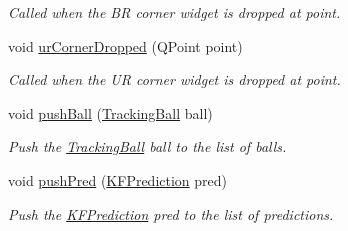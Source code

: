 \begin{DoxyCompactItemize}
\begin{DoxyCompactList}\small\item\em Called when the BR corner widget is dropped at point. \end{DoxyCompactList}\item 
void \hyperlink{classTrackVideoWidget_aa0ffe7455a1940941387f3bf8a8c81a0}{ur\+Corner\+Dropped} (Q\+Point point)\hypertarget{classTrackVideoWidget_aa0ffe7455a1940941387f3bf8a8c81a0}{}\label{classTrackVideoWidget_aa0ffe7455a1940941387f3bf8a8c81a0}

\begin{DoxyCompactList}\small\item\em Called when the UR corner widget is dropped at point. \end{DoxyCompactList}\item 
void \hyperlink{classTrackVideoWidget_a29f589a7716093ffe59af7e66eebf72a}{push\+Ball} (\hyperlink{classTrackingBall}{Tracking\+Ball} ball)\hypertarget{classTrackVideoWidget_a29f589a7716093ffe59af7e66eebf72a}{}\label{classTrackVideoWidget_a29f589a7716093ffe59af7e66eebf72a}

\begin{DoxyCompactList}\small\item\em Push the \hyperlink{classTrackingBall}{Tracking\+Ball} ball to the list of balls. \end{DoxyCompactList}\item 
void \hyperlink{classTrackVideoWidget_ae9e2d736b274c1601af5f8f1ca36586a}{push\+Pred} (\hyperlink{classKFPrediction}{K\+F\+Prediction} pred)\hypertarget{classTrackVideoWidget_ae9e2d736b274c1601af5f8f1ca36586a}{}\label{classTrackVideoWidget_ae9e2d736b274c1601af5f8f1ca36586a}

\begin{DoxyCompactList}\small\item\em Push the \hyperlink{classKFPrediction}{K\+F\+Prediction} pred to the list of predictions. \end{DoxyCompactList}\end{DoxyCompactItemize}

